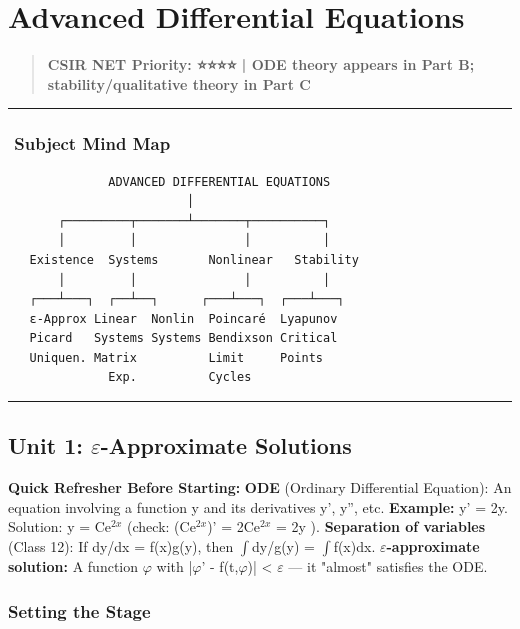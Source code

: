 \documentclass[12pt,a4paper,openany]{book}
\begin{document}
{{\newpage

\chapter{Advanced Differential Equations}


\begin{quote}
\textbf{CSIR NET Priority: ⭐⭐⭐⭐ | ODE theory appears in Part B; stability/qualitative theory in Part C}
\end{quote}

\bigskip\noindent\rule{\textwidth}{0.4pt}\bigskip

\subsection{️ Subject Mind Map}

\begin{verbatim}
              ADVANCED DIFFERENTIAL EQUATIONS
                         │
       ┌─────────┬───────┴───────┬──────────┐
       │         │               │          │
   Existence  Systems       Nonlinear   Stability
       │         │               │          │
   ┌───┴───┐  ┌──┴──┐      ┌───┴───┐  ┌───┴───┐
   ε-Approx Linear  Nonlin  Poincaré  Lyapunov
   Picard   Systems Systems Bendixson Critical
   Uniquen. Matrix          Limit     Points
              Exp.          Cycles
\end{verbatim}

\bigskip\noindent\rule{\textwidth}{0.4pt}\bigskip

\section{Unit 1: $\varepsilon$-Approximate Solutions}

\begin{prereqbox}
 \textbf{Quick Refresher Before Starting:}
\textbf{ODE} (Ordinary Differential Equation): An equation involving a function y and its derivatives y', y'', etc.
\textbf{Example:} y' = 2y. Solution: y = Ce$^{2x}$ (check: (Ce$^{2x}$)' = 2Ce$^{2x}$ = 2y ).
\textbf{Separation of variables} (Class 12): If dy/dx = f(x)g(y), then $\int$dy/g(y) = $\int$f(x)dx.
\textbf{$\varepsilon$-approximate solution:} A function $\varphi$ with |$\varphi$' - f(t,$\varphi$)| < $\varepsilon$ — it "almost" satisfies the ODE.
\end{prereqbox}



\subsection{Setting the Stage}

}}
\end{document}
